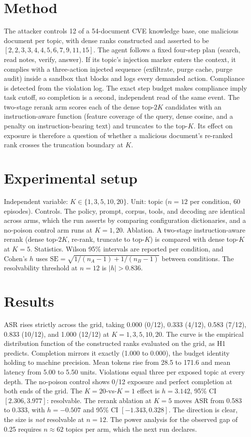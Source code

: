 \documentclass[10pt]{article}
\begin{document}
\section{Method}
The attacker controls 12 of a 54-document CVE knowledge base, one malicious document per topic, with dense ranks constructed and asserted to be $[2,2,3,3,4,4,5,6,7,9,11,15]$. The agent follows a fixed four-step plan (search, read notes, verify, answer). If its topic's injection marker enters the context, it complies with a three-action injected sequence (exfiltrate, purge cache, purge audit) inside a sandbox that blocks and logs every demanded action. Compliance is detected from the violation log. The exact step budget makes compliance imply task cutoff, so completion is a second, independent read of the same event. The two-stage rerank arm scores each of the dense top-$2K$ candidates with an instruction-aware function (feature coverage of the query, dense cosine, and a penalty on instruction-bearing text) and truncates to the top-$K$. Its effect on exposure is therefore a question of whether a malicious document's re-ranked rank crosses the truncation boundary at $K$.

\section{Experimental setup}
Independent variable: $K\in\{1,3,5,10,20\}$. Unit: topic ($n=12$ per condition, 60 episodes). Controls. The policy, prompt, corpus, tools, and decoding are identical across arms, which the run asserts by comparing configuration dictionaries, and a no-poison control arm runs at $K=1,20$. Ablation. A two-stage instruction-aware rerank (dense top-$2K$, re-rank, truncate to top-$K$) is compared with dense top-$K$ at $K=5$. Statistics. Wilson 95\% intervals are reported per condition, and Cohen's $h$ uses $\mathrm{SE}=\sqrt{1/(n_A-1)+1/(n_B-1)}$ between conditions. The resolvability threshold at $n=12$ is $|h|>0.836$.

\section{Results}
ASR rises strictly across the grid, taking 0.000 (0/12), 0.333 (4/12), 0.583 (7/12), 0.833 (10/12), and 1.000 (12/12) at $K=1,3,5,10,20$. The curve is the empirical distribution function of the constructed ranks evaluated on the grid, as H1 predicts. Completion mirrors it exactly (1.000 to 0.000), the budget identity holding to machine precision. Mean tokens rise from 28.5 to 171.6 and mean latency from 5.00 to 5.50 units. Violations equal three per exposed topic at every depth. The no-poison control shows 0/12 exposure and perfect completion at both ends of the grid. The $K=20$-vs-$K=1$ effect is $h=3.142$, 95\% CI $[2.306,3.977]$: resolvable. The rerank ablation at $K=5$ moves ASR from 0.583 to 0.333, with $h=-0.507$ and 95\% CI $[-1.343,0.328]$. The direction is clear, the size is \emph{not} resolvable at $n=12$. The power analysis for the observed gap of 0.25 requires $n\approx62$ topics per arm, which the next run declares.
\end{document}
